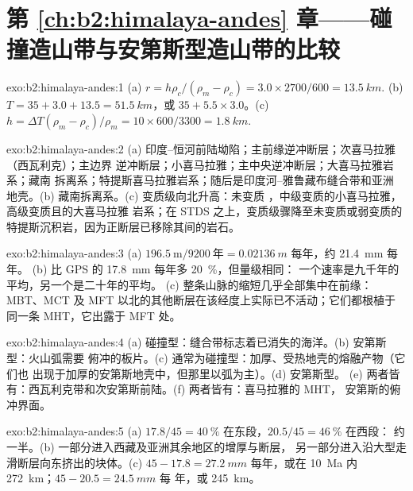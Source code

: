 \section*{第 \ref{ch:b2:himalaya-andes} 章——碰撞造山带与安第斯型造山带的比较}

\begin{solution}{exo:b2:himalaya-andes:1}
(a) $r = h\rho_c/(\rho_m - \rho_c) = 3.0\times2700/600 = \qty{13.5}{km}$. (b) $T = 35 + 3.0 +
13.5 = \qty{51.5}{km}$，或 $35 + 5.5\times3.0$。(c) $h = \Delta T(\rho_m - \rho_c)/\rho_m =
10\times600/3300 = \qty{1.8}{km}$.
\end{solution}

\begin{solution}{exo:b2:himalaya-andes:2}
(a) 印度–恒河前陆坳陷；主前缘逆冲断层；次喜马拉雅（西瓦利克）；主边界
逆冲断层；小喜马拉雅；主中央逆冲断层；大喜马拉雅岩系；藏南
拆离系；特提斯喜马拉雅岩系；随后是印度河–雅鲁藏布缝合带和亚洲
地壳。(b) 藏南拆离系。(c) 变质级向北升高：未变质
，中级变质的小喜马拉雅，高级变质且的大喜马拉雅
岩系；在 STDS 之上，变质级骤降至未变质或弱变质的
特提斯沉积岩，因为正断层已移除其间的岩石。
\end{solution}

\begin{solution}{exo:b2:himalaya-andes:3}
(a) $196.5\ \text{m}/9200\ \text{年} = \qty{0.02136}{m}$ 每年，约 \qty{21.4}{mm} 每年。
(b) 比 GPS 的 \qty{17.8}{mm} 每年多 \qty{20}{\percent}，但量级相同：
一个速率是九千年的平均，另一个是二十年的平均。
(c) 整条山脉的缩短几乎全部集中在前缘：MBT、MCT 及
MFT 以北的其他断层在该经度上实际已不活动；它们都根植于
同一条 MHT，它出露于 MFT 处。
\end{solution}

\begin{solution}{exo:b2:himalaya-andes:4}
(a) 碰撞型：缝合带标志着已消失的海洋。(b) 安第斯型：火山弧需要
俯冲的板片。(c) 通常为碰撞型：加厚、受热地壳的熔融产物（它们也
出现于加厚的安第斯地壳中，但那里以弧为主）。(d) 安第斯型。
(e) 两者皆有：西瓦利克带和次安第斯前陆。(f) 两者皆有：喜马拉雅的 MHT，
安第斯的俯冲界面。
\end{solution}

\begin{solution}{exo:b2:himalaya-andes:5}
(a) $17.8/45 = \qty{40}{\percent}$ 在东段，$20.5/45 = \qty{46}{\percent}$ 在西段：
约一半。(b) 一部分进入西藏及亚洲其余地区的增厚与断层，
另一部分进入沿大型走滑断层向东挤出的块体。(c) $45 - 17.8 =
\qty{27.2}{mm}$ 每年，或在 \qty{10}{Ma} 内 \qty{272}{km}；$45 - 20.5 = \qty{24.5}{mm}$ 每
年，或 \qty{245}{km}。
\end{solution}

